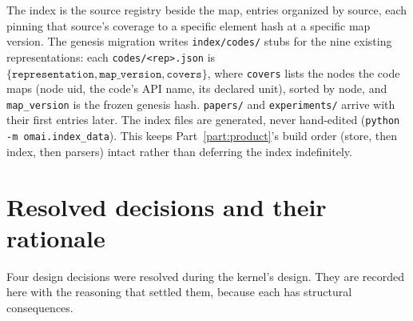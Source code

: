 \documentclass[11pt,a4paper]{article}
\begin{document}
The index is the source registry beside the map, entries organized by source,
each pinning that source's coverage to a specific element hash at a specific map
version. The genesis migration writes \texttt{index/codes/} stubs for the nine
existing representations: each \texttt{codes/<rep>.json} is
$\{\texttt{representation}, \texttt{map\_version}, \texttt{covers}\}$, where
\texttt{covers} lists the nodes the code maps (node uid, the code's API name, its
declared unit), sorted by node, and \texttt{map\_version} is the frozen genesis
hash. \texttt{papers/} and \texttt{experiments/} arrive with their first entries
later. The index files are generated, never hand-edited
(\texttt{python -m omai.index\_data}). This keeps Part~\ref{part:product}'s build
order (store, then index, then parsers) intact rather than deferring the index
indefinitely.

\section{Resolved decisions and their rationale}
\label{sec:kernel-decisions}

Four design decisions were resolved during the kernel's design. They are recorded
here with the reasoning that settled them, because each has structural
consequences.
\end{document}
